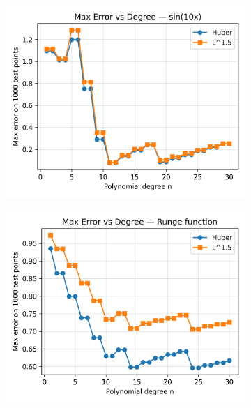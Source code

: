 \documentclass[a4paper,12pt]{article}
\begin{document}
\begin{figure}[h!]
    \centering
    \begin{subfigure}[b]{0.49\linewidth}
        \centering
        \includegraphics[width=\linewidth]{fig/exercise3_error_vs_degree_sin10x.png}
    \end{subfigure}
    \hfill
    \begin{subfigure}[b]{0.49\linewidth}
        \centering
        \includegraphics[width=\linewidth]{fig/exercise3_error_vs_degree_Runge_function.png}
    \end{subfigure}
    

\end{figure}
\end{document}
